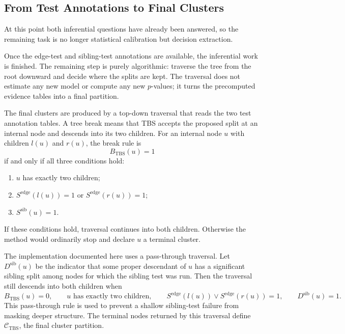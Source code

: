 
\subsection{From Test Annotations to Final Clusters}

At this point both inferential questions have already been answered, so the
remaining task is no longer statistical calibration but decision extraction.

Once the edge-test and sibling-test annotations are available, the inferential
work is finished. The remaining step is purely algorithmic: traverse the tree
from the root downward and decide where the splits are kept. The traversal does
not estimate any new model or compute any new $p$-values; it turns the
precomputed evidence tables into a final partition.

The final clusters are produced by a top-down traversal that reads the two test
annotation tables. A tree break means that TBS accepts the proposed split at an
internal node and descends into its two children. For an internal node $u$ with
children $l(u)$ and $r(u)$, the break rule is
\begin{equation}
B_{\mathrm{TBS}}(u) = 1
\end{equation}
if and only if all three conditions hold:
\begin{enumerate}[leftmargin=1.5em]
  \item $u$ has exactly two children;
  \item $S^{\mathrm{edge}}(l(u)) = 1$ or $S^{\mathrm{edge}}(r(u)) = 1$;
  \item $S^{\mathrm{sib}}(u) = 1$.
\end{enumerate}
If these conditions hold, traversal continues into both children. Otherwise the
method would ordinarily stop and declare $u$ a terminal cluster.

The implementation documented here uses a pass-through traversal. Let
$D^{\mathrm{sib}}(u)$ be the indicator that some proper descendant of $u$ has a
significant sibling split among nodes for which the sibling test was run. Then
the traversal still descends into
both children when
\begin{equation}
B_{\mathrm{TBS}}(u) = 0,
\qquad
u \text{ has exactly two children},
\qquad
S^{\mathrm{edge}}(l(u)) \vee S^{\mathrm{edge}}(r(u)) = 1,
\qquad
D^{\mathrm{sib}}(u) = 1.
\end{equation}
This pass-through rule is used to prevent a shallow sibling-test failure from
masking deeper structure. The terminal nodes returned by this traversal define
\(\mathcal C_{\mathrm{TBS}}\), the final cluster partition.
